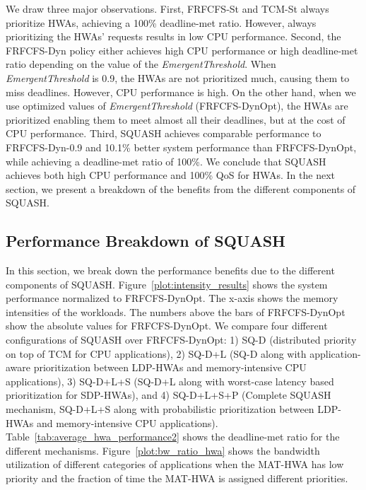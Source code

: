 \documentclass[10pt,letterpaper]{article}
\newcommand{\MODIFIEDISCA}[1]{#1}
\newcommand{\ldphwas}[0]{LDP-HWAs\xspace}
\newcommand{\sdphwas}[0]{SDP-HWAs\xspace}
\begin{document}
 

We draw three major observations. First, FRFCFS-St and TCM-St always prioritize
HWAs, achieving a 100\% deadline-met ratio. However, always prioritizing the
HWAs' requests results in low CPU performance. Second, the FRFCFS-Dyn policy either
achieves high CPU performance or high deadline-met ratio depending on the value
of the {\it EmergentThreshold}. When {\it EmergentThreshold} is 0.9, the HWAs
are not prioritized much, causing them to miss deadlines. However, CPU
performance is high. 
\MODIFIEDISCA{On the other hand, when we use optimized values of {\it
EmergentThreshold} (FRFCFS-DynOpt), the HWAs are prioritized enabling them to
meet almost all their deadlines, but at the cost of CPU performance. Third,
SQUASH achieves comparable performance to FRFCFS-Dyn-0.9 and 10.1\% better
system performance than FRFCFS-DynOpt, while achieving a deadline-met ratio of
100\%. 
We conclude that SQUASH achieves both high CPU performance and 100\% QoS for
HWAs. In the next section, we present a breakdown of the benefits from the
different components of SQUASH.}



\subsection{Performance Breakdown of SQUASH} \label{sec:intensity} 
In this section, we break down the performance benefits due to the different components
of SQUASH. Figure~\ref{plot:intensity_results} shows the system performance 
normalized to FRFCFS-DynOpt. The x-axis shows the memory intensities of the
workloads. The numbers above the bars of FRFCFS-DynOpt show the absolute values
for FRFCFS-DynOpt. 
We compare four different configurations of SQUASH over
FRFCFS-DynOpt: 1) SQ-D (distributed priority on top of TCM for CPU
applications), 2) SQ-D+L (SQ-D along with application-aware prioritization
between \ldphwas and memory-intensive CPU applications), 3) SQ-D+L+S (SQ-D+L
along with worst-case latency based prioritization for \sdphwas), and 4)
SQ-D+L+S+P (Complete SQUASH mechanism, SQ-D+L+S along with probabilistic prioritization between \ldphwas
and memory-intensive CPU applications). 
Table~\ref{tab:average_hwa_performance2} shows the deadline-met ratio for the
different mechanisms. Figure~\ref{plot:bw_ratio_hwa} shows the bandwidth
utilization of different categories of applications when the MAT-HWA has low
priority and the fraction of time the MAT-HWA is assigned different priorities.
\end{document}

